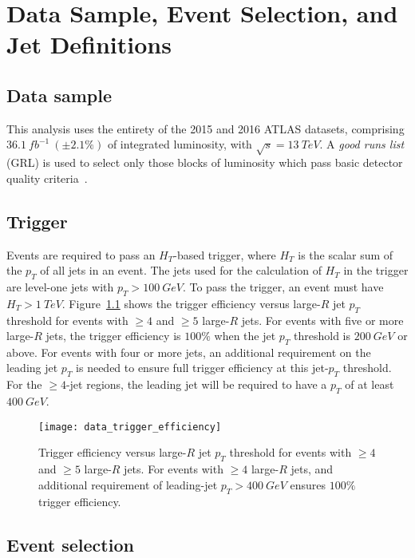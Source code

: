 \chapter{Data Sample, Event Selection, and Jet Definitions}\label{ch:data_and_event_selection}

\section{Data sample}\label{sec:data}
This analysis uses the entirety of the 2015 and 2016 ATLAS datasets, comprising \linebreak $36.1~fb^{-1}~(\pm2.1\%)$ of integrated luminosity, with $\sqrt{s}=13~TeV$.
A \textit{good runs list} (GRL) is used to select only those blocks of luminosity which pass basic detector quality criteria~\cite{data-grl}.

\section{Trigger}\label{sec:trigger}
Events are required to pass an $H_{T}$-based trigger, where $H_{T}$ is the scalar sum of the $p_{T}$ of all jets in an event.
The jets used for the calculation of $H_{T}$ in the trigger are level-one jets with $p_{T}>100~GeV$.
To pass the trigger, an event must have $H_{T}>1~TeV$.
Figure~\ref{fig:trigger_efficiency} shows the trigger efficiency versus large-$R$ jet $p_{T}$ threshold for events with $\geq4$ and $\geq5$ large-$R$ jets.
For events with five or more large-$R$ jets, the trigger efficiency is $100\%$ when the jet $p_{T}$ threshold is $200~GeV$ or above.
For events with four or more jets, an additional requirement on the leading jet $p_{T}$ is needed to ensure full trigger efficiency at this jet-$p_{T}$ threshold.
For the $\geq4$-jet regions, the leading jet will be required to have a $p_{T}$ of at least $400~GeV$.

\begin{figure}[!ht]
    \centering
    \texttt{[image: data\_trigger\_efficiency]}
    \caption{Trigger efficiency versus large-$R$ jet $p_{T}$ threshold for events with $\geq4$ and $\geq5$ large-$R$ jets.
    For events with $\geq4$ large-$R$ jets, and additional requirement of leading-jet $p_{T}>400~GeV$ ensures $100\%$ trigger efficiency.
    }
    \label{fig:trigger_efficiency}
\end{figure}

\section{Event selection}\label{sec:event_selection}

